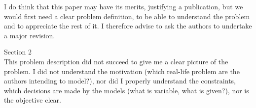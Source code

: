 \documentclass{article}
\newenvironment{reviewer}{\setcounter{pointcounter}{1}}{}
\newcommand{\point}{\text{{\selectfont \thepointcounter} \stepcounter{pointcounter}}}
\begin{document}
\begin{reviewer}
\begin{tcolorbox}[breakable,enhanced,coltitle=black,colback=red!5!white,colframe=red!75!black,title=\textbf{Answer R1.\point},borderline={1pt}{0pt}{black},boxrule=0pt]

\end{tcolorbox}

\begin{itshape}
I do think that this paper may have its merits, justifying a publication, but we would first need a clear problem definition, to be able to understand the problem and to appreciate the rest of it.
I therefore advise to ask the authors to undertake a major revision.
\end{itshape}

\begin{tcolorbox}[breakable,enhanced,coltitle=black,colback=red!5!white,colframe=red!75!black,title=\textbf{Answer R1.\point},borderline={1pt}{0pt}{black},boxrule=0pt]

\end{tcolorbox}

\begin{itshape}
Section 2\\
This problem description did not succeed to give me a clear picture of the problem. I did not understand the motivation (which real-life problem are the authors intending to model?), nor did I properly understand the constraints, which decisions are made by the models (what is variable, what is given?), nor is the objective clear.
\end{itshape}

\begin{tcolorbox}[breakable,enhanced,coltitle=black,colback=red!5!white,colframe=red!75!black,title=\textbf{Answer R1.\point},borderline={1pt}{0pt}{black},boxrule=0pt]

\end{tcolorbox}


\end{reviewer}
\end{document}
